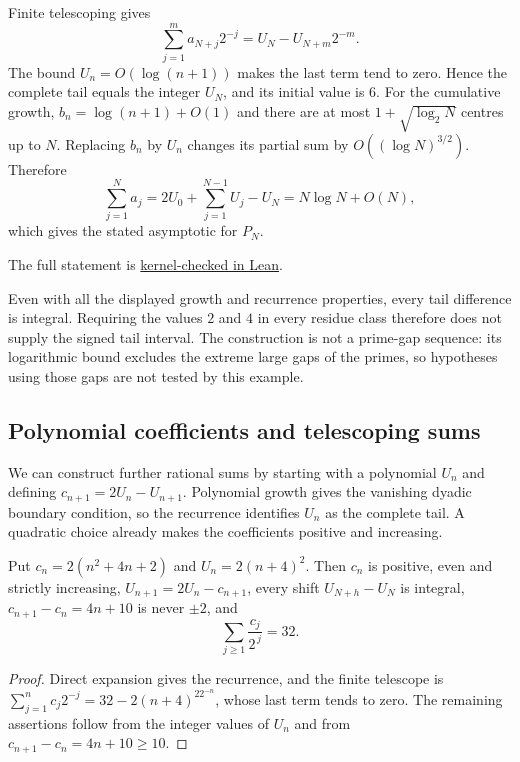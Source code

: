 \documentclass[11pt]{article}
\makeatletter
\newcommand{\compatlabel}[1]{\ltx@label{#1}}
\makeatother
\begin{document}
Finite telescoping gives
\[
 \sum_{j=1}^{m}a_{N+j}2^{-j}=U_N-U_{N+m}2^{-m}.
\]
The bound $U_n=O(\log(n+1))$ makes the last term tend to zero.  Hence the
complete tail equals the integer $U_N$, and its initial value is $6$.
For the cumulative growth, $b_n=\log(n+1)+O(1)$ and there are at most
$1+\sqrt{\log_2 N}$ centres up to $N$.  Replacing $b_n$ by $U_n$ changes
its partial sum by $O((\log N)^{3/2})$.  Therefore
\[
 \sum_{j=1}^{N}a_j=2U_0+\sum_{j=1}^{N-1}U_j-U_N
                =N\log N+O(N),
\]
which gives the stated asymptotic for $P_N$.

The full statement is \href{https://github.com/wcook04/plectis-erdos/blob/3d6d938d696fed0fb71dd55115a18a73738ff223/lean/ErdosProblems/Erdos251/AllResidueLogarithmicR9.lean\#L503}{kernel-checked in Lean}.


Even with all the displayed growth and recurrence properties, every
tail difference is integral.  Requiring the values $2$ and $4$ in every
residue class therefore does not supply the signed tail interval.
The construction is not a prime-gap sequence: its logarithmic bound
excludes the extreme large gaps of the primes, so hypotheses using
those gaps are not tested by this example.

\subsection{Polynomial coefficients and telescoping sums}

We can construct further rational sums by starting with a polynomial
$U_n$ and defining $c_{n+1}=2U_n-U_{n+1}$.  Polynomial growth gives the
vanishing dyadic boundary condition, so the recurrence identifies $U_n$
as the complete tail.  A quadratic choice already makes the coefficients
positive and increasing.

\begin{proposition}\label{long251:res:polynomialcountermodel}\compatlabel{res:polynomialcountermodel}
Put $c_n=2(n^2+4n+2)$ and $U_n=2(n+4)^2$.  Then $c_n$ is positive, even and
strictly increasing, $U_{n+1}=2U_n-c_{n+1}$, every shift $U_{N+h}-U_N$ is
integral, $c_{n+1}-c_n=4n+10$ is never $\pm2$, and
\[
 \sum_{j\ge1}\frac{c_j}{2^{\,j}}=32 .
\]
\end{proposition}

\begin{proof}
Direct expansion gives the recurrence, and the finite telescope is
$\sum_{j=1}^{n}c_j2^{-j}=32-2(n+4)^22^{-n}$, whose last term tends to zero.
The remaining assertions follow from the integer values of $U_n$ and from
$c_{n+1}-c_n=4n+10\ge10$.
\end{proof}
\end{document}
